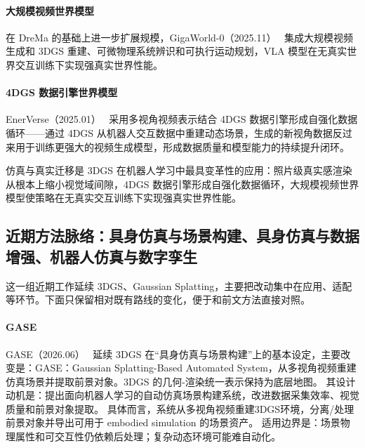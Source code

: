 \paragraph{大规模视频世界模型}

在 DreMa 的基础上进一步扩展规模，GigaWorld-0（2025.11）~\cite{2511_19861} 集成大规模视频生成和 3DGS 重建、可微物理系统辨识和可执行运动规划，VLA 模型在无真实世界交互训练下实现强真实世界性能。

\paragraph{4DGS 数据引擎世界模型}

EnerVerse（2025.01）~\cite{2501_01895} 采用多视角视频表示结合 4DGS 数据引擎形成自强化数据循环——通过 4DGS 从机器人交互数据中重建动态场景，生成的新视角数据反过来用于训练更强大的视频生成模型，形成数据质量和模型能力的持续提升闭环。

\begin{takeaway}
仿真与真实迁移是 3DGS 在机器人学习中最具变革性的应用：照片级真实感渲染从根本上缩小视觉域间隙，4DGS 数据引擎形成自强化数据循环，大规模视频世界模型使策略在无真实交互训练下实现强真实世界性能。
\end{takeaway}


\subsection{近期方法脉络：具身仿真与场景构建、具身仿真与数据增强、机器人仿真与数字孪生}

这一组近期工作延续 3DGS、Gaussian Splatting，主要把改动集中在应用、适配等环节。下面只保留相对既有路线的变化，便于和前文方法直接对照。

\paragraph{GASE}
GASE（2026.06）~\cite{2606_17520} 延续 3DGS 在“具身仿真与场景构建”上的基本设定，主要改变是：GASE：Gaussian Splatting-Based Automated System，从多视角视频重建仿真场景并提取前景对象。3DGS 的几何-渲染统一表示保持为底层地图。
其设计动机是：提出面向机器人学习的自动仿真场景构建系统，改进数据采集效率、视觉质量和前景对象提取。
具体而言，系统从多视角视频重建3DGS环境，分离/处理前景对象并导出可用于 embodied simulation 的场景资产。
适用边界是：场景物理属性和可交互性仍依赖后处理；复杂动态环境可能难自动化。

